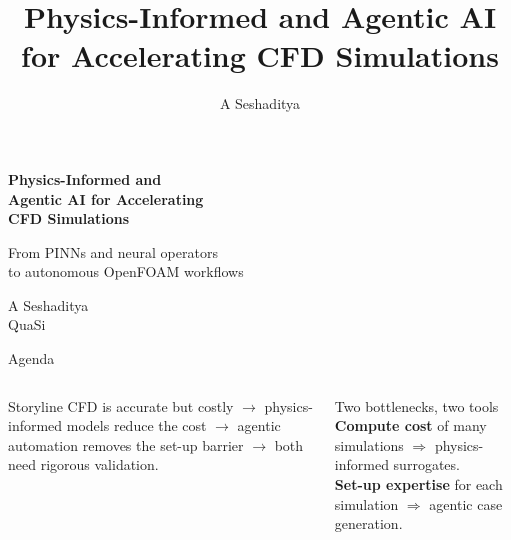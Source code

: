 \documentclass[aspectratio=169,10pt]{beamer}
\title{Physics-Informed and Agentic AI\\for Accelerating CFD Simulations}
\author{A Seshaditya}
\institute{QuaSi}
\date{}
\begin{document}
\begin{frame}[plain]
  \vspace{0.9cm}
  \begin{minipage}[t][0.78\textheight]{0.74\textwidth}
    \raggedright
    {\color{white}\fontsize{22}{27}\selectfont\bfseries Physics-Informed and\\Agentic AI for Accelerating\\CFD Simulations\par}
    \vspace{0.45cm}
    {\color{white!80}\large From PINNs and neural operators\\to autonomous OpenFOAM workflows\par}
    \vfill
    {\color{white}\large A Seshaditya\\[1mm]QuaSi\par}
  \end{minipage}
\end{frame}

\begin{frame}{Agenda}
  \begin{columns}[T,onlytextwidth]
    \vspace{0.2cm}
    \tableofcontents[hideallsubsections]
    \begin{block}{Storyline}
      \small
      CFD is accurate but costly $\rightarrow$ physics-informed models reduce the cost
      $\rightarrow$ agentic automation removes the set-up barrier $\rightarrow$ both need
      rigorous validation.
    \end{block}
    \begin{block}{Two bottlenecks, two tools}
      \small
      \textbf{Compute cost} of many simulations $\Rightarrow$ physics-informed surrogates.\\
      \textbf{Set-up expertise} for each simulation $\Rightarrow$ agentic case generation.
    \end{block}
  \end{columns}
\end{frame}
\end{document}
